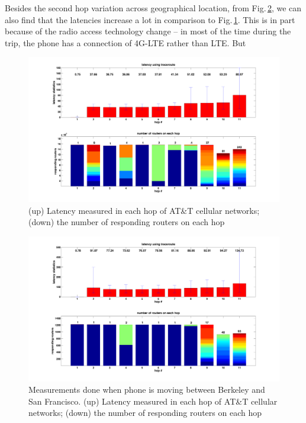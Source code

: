 Besides the second hop variation across geographical location, from Fig.\,\ref{fig:mobile_mobile}, we can also find that the latencies increase a lot in comparison to Fig.\,\ref{fig:mobile_latency}. This is in part because of the radio access technology change -- in most of the time during the trip, the phone has a connection of 4G-LTE rather than LTE. But 

\begin{figure}
  \centering
  \includegraphics[width=\linewidth]{../figs/mobile_latency.pdf}
  \caption{(up) Latency measured in each hop of AT\&T cellular networks; (down) the number of responding routers on each hop}
  \label{fig:mobile_latency}
\end{figure}

\begin{figure}
  \centering
  \includegraphics[width=\linewidth]{../figs/mobile_sfo.pdf}
  \caption{Measurements done when phone is moving between Berkeley and San Francisco. (up) Latency measured in each hop of AT\&T cellular networks; (down) the number of responding routers on each hop}
  \label{fig:mobile_mobile}
\end{figure}


